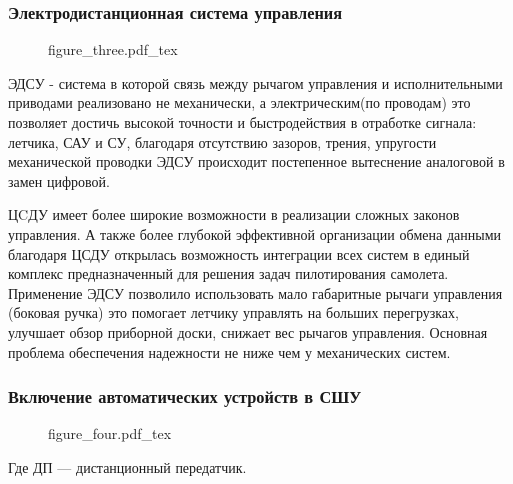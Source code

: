 \documentclass{article}
\begin{document}
\subsubsection{Электродистанционная система управления}
\begin{figure}[ht]
    {figure_three.pdf_tex}
\end{figure}

ЭДСУ - система в которой связь между рычагом управления и исполнительными
приводами реализовано не механически, а электрическим(по проводам) это
позволяет достичь высокой точности и быстродействия в отработке сигнала:
летчика, САУ и СУ, благодаря отсутствию зазоров, трения, упругости механической
проводки ЭДСУ происходит постепенное вытеснение аналоговой в замен цифровой.

ЦCДУ имеет более широкие возможности в реализации сложных законов управления. А
также более глубокой эффективной организации обмена данными благодаря ЦСДУ
открылась возможность интеграции всех систем в единый комплекс предназначенный
для решения задач пилотирования самолета. Применение ЭДСУ позволило
использовать мало габаритные рычаги управления (боковая ручка) это помогает
летчику управлять на больших перегрузках, улучшает обзор приборной доски,
снижает вес рычагов управления. Основная проблема обеспечения надежности не
ниже чем у механических систем.
\newpage

\subsubsection{Включение автоматических устройств в СШУ}
\begin{figure}[ht!]
    {figure_four.pdf_tex}
\end{figure}

Где ДП --- дистанционный передатчик.
\end{document}
